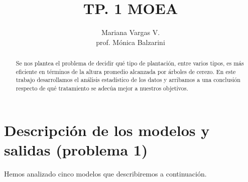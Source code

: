 \documentclass[a4paper,10pt]{article}
\title{TP. 1 MOEA}
\author{Mariana Vargas V. \\ prof. Mónica Balzarini}
\begin{document}
\maketitle

\begin{abstract}
Se nos plantea el problema de decidir qué tipo de plantación, entre varios tipos, es más eficiente en términos de la altura promedio 
alcanzada por árboles de cerezo. En este trabajo desarrollamos el análisis estadístico de los datos y arribamos a una conclusión respecto de qué tratamiento
se adecúa mejor a nuestros objetivos.
\end{abstract}

\section{Descripción de los modelos y salidas (problema 1)}

Hemos analizado cinco modelos que describiremos a continuación. 
\end{document}
